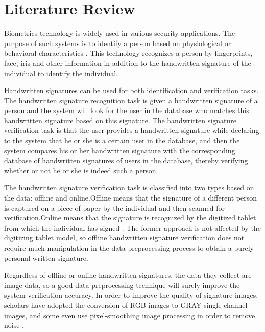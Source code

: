 \documentclass{article}
\begin{document}
\newpage
\section{Literature Review}

Biometrics technology is widely used in various security applications. The purpose of such systems is to identify a person based on physiological or behavioral characteristics \cite{1}. This technology recognizes a person by fingerprints, face, iris and other information in addition to the handwritten signature of the individual to identify the individual.

Handwritten signatures can be used for both identification and verification tasks. The handwritten signature recognition task is given a handwritten signature of a person and the system will look for the user in the database who matches this handwritten signature based on this signature. The handwritten signature verification task is that the user provides a handwritten signature while declaring to the system that he or she is a certain user in the database, and then the system compares his or her handwritten signature with the corresponding database of handwritten signatures of users in the database, thereby verifying whether or not he or she is indeed such a person.

The handwritten signature verification task is classified into two types based on the data: offline and online.Offline means that the signature of a different person is captured on a piece of paper by the individual and then scanned for verification.Online means that the signature is recognized by the digitized tablet from which the individual has signed \cite{3}. The former approach is not affected by the digitizing tablet model, so offline handwritten signature verification does not require much manipulation in the data preprocessing process to obtain a purely personal written signature.

Regardless of offline or online handwritten signatures, the data they collect are image data, so a good data preprocessing technique will surely improve the system verification accuracy. In order to improve the quality of signature images, scholars have adopted the conversion of RGB images to GRAY single-channel images, and some even use pixel-smoothing image processing in order to remove noise \cite{4}.
\end{document}
